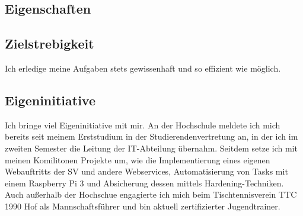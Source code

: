 \documentclass[
	10pt, %
]{FreemanCV}
\begin{document}
\begin{paracol}{2}
%
%
%
%
%
%
%
%
%
%
%

\section{Eigenschaften}

\subsection{Zielstrebigkeit}

Ich erledige meine Aufgaben stets gewissenhaft und so effizient wie möglich.

\subsection{Eigeninitiative}

Ich bringe viel Eigeninitiative mit mir. An der Hochschule meldete ich mich bereits seit meinem Erststudium in der Studierendenvertretung an,
in der ich im zweiten Semester die Leitung der IT-Abteilung übernahm. Seitdem setze ich mit meinen Komilitonen Projekte um, wie
die Implementierung eines eigenen Webauftritts der SV und andere Webservices, Automatisierung von Tasks mit einem Raspberry Pi 3 und Absicherung dessen mittels Hardening-Techniken. \newline
Auch außerhalb der Hochschue engagierte ich mich beim Tischtennisverein TTC 1990 Hof als Mannschaftsführer und bin aktuell zertifizierter Jugendtrainer.


\end{paracol}
\end{document}
